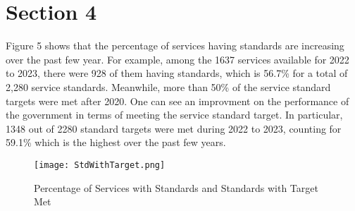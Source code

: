 \section{Section 4}

Figure 5 shows that the percentage of services having standards are
increasing over the past few year. For example, among the 1637 services 
available for 2022 to 2023, there were 928 of them having standards, 
which is 56.7\% for a total of 2,280 service standards. Meanwhile, more
than 50\% of the service standard targets were met after 2020. One can
see an improvment on the performance of the government in terms of meeting
the service standard target. In particular, 1348 out of 2280 standard 
targets were met during 2022 to 2023, counting for 59.1\% which is the 
highest over the past few years.

\begin{figure}
    \centering
    \texttt{[image: StdWithTarget.png]}
    \caption{\label{fig:Std}Percentage of Services with Standards and Standards with Target Met}
\end{figure}
